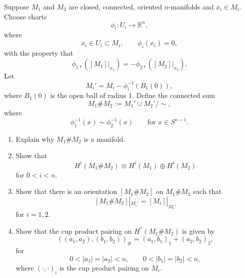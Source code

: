 \begin{problem}
Suppose \(M_{1}\) and \(M_{2}\) are closed, connected, oriented
\(n\)-manifolds and \(x_i\in M_i\). Choose charts
\[
\phi_i:U_i\longrightarrow \mathbb{R}^{n},
\]
where
\[
x_i\in U_i\subset M_i,
\qquad
\phi_i(x_i)=0,
\]
with the property that
\[
\phi_{1*}([M_1]|_{x_1})
=
-\phi_{2*}([M_2]|_{x_2}).
\]
Let
\[
M_i'
=
M_i-\phi_i^{-1}(B_1(0)),
\]
where \(B_1(0)\) is the open ball of radius \(1\). Define the connected sum
\[
M_1\# M_2
:=
M_1'\cup M_2'/\sim,
\]
where
\[
\phi_1^{-1}(x)\sim \phi_2^{-1}(x)
\qquad
\text{for }x\in S^{n-1}.
\]

\begin{enumerate}
	\item[(a)] Explain why \(M_1\# M_2\) is a manifold.

	\item[(b)] Show that
	\[
	H^i(M_1\#M_2)
	\cong
	H^i(M_1)\oplus H^i(M_2)
	\]
	for \(0<i<n\).

	\item[(c)] Show that there is an orientation \([M_1\#M_2]\) on
	\(M_1\#M_2\) such that
	\[
	[M_1\#M_2]|_{M_i'}
	=
	[M_i]|_{M_i'}
	\]
	for \(i=1,2\).

	\item[(d)] Show that the cup product pairing on \(H^*(M_1\#M_2)\)
	is given by
	\[
	((a_1,a_2),(b_1,b_2))_{\#}
	=
	(a_1,b_1)_1+(a_2,b_2)_2,
	\]
	for
	\[
	0<|a_1|=|a_2|<n,
	\qquad
	0<|b_1|=|b_2|<n,
	\]
	where \((\cdot,\cdot)_i\) is the cup product pairing on \(M_i\).
\end{enumerate}
\end{problem}

